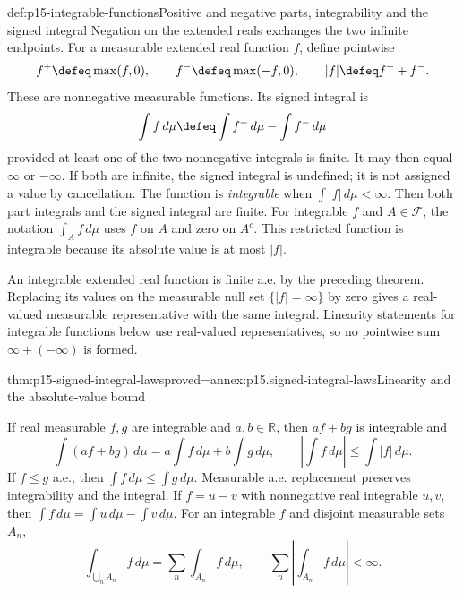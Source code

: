 \begin{hbdefinition}{def:p15-integrable-functions}{Positive and negative parts, integrability and the signed integral}
Negation on the extended reals exchanges the two infinite endpoints.
For a measurable extended real function \(f\), define pointwise
\[
 f^+\defeq\max(f,0),\qquad f^-\defeq\max(-f,0),\qquad
 |f|\defeq f^++f^-.
\]
These are nonnegative measurable functions. Its signed integral is
\[
 \int f\,d\mu\defeq\int f^+\,d\mu-\int f^-\,d\mu
\]
provided at least one of the two nonnegative integrals is finite.
It may then equal \(\infty\) or \(-\infty\). If both are infinite,
the signed integral is undefined; it is not assigned a value by cancellation.
The function is \emph{integrable} when \(\int|f|\,d\mu<\infty\).
Then both part integrals and the signed integral are finite.
For integrable \(f\) and \(A\in\mathcal F\), the notation
\(\int_A f\,d\mu\) uses \(f\) on \(A\) and zero on \(A^c\).
This restricted function is integrable because its absolute value is
at most \(|f|\).

An integrable extended real function is finite a.e. by the preceding
theorem. Replacing its values on the measurable null set
\(\{|f|=\infty\}\) by zero gives a real-valued measurable
representative with the same integral. Linearity statements for integrable
functions below use real-valued representatives, so no pointwise sum
\(\infty+(-\infty)\) is formed.
\end{hbdefinition}

\begin{hbtheorem}{thm:p15-signed-integral-laws}{proved=annex:p15.signed-integral-laws}{Linearity and the absolute-value bound}
\par\nobreak
If real measurable \(f,g\) are integrable and \(a,b\in\mathbb R\),
then \(af+bg\) is integrable and
\[
 \int(af+bg)\,d\mu=a\int f\,d\mu+b\int g\,d\mu,
 \qquad
 \left|\int f\,d\mu\right|\leq\int|f|\,d\mu.
\]
If \(f\leq g\) a.e., then \(\int f\,d\mu\leq\int g\,d\mu\).
Measurable a.e. replacement preserves integrability and the integral.
If \(f=u-v\) with nonnegative real integrable \(u,v\), then
\(\int f\,d\mu=\int u\,d\mu-\int v\,d\mu\).
For an integrable \(f\) and disjoint measurable sets \(A_n\),
\[
 \int_{\bigcup_n A_n}f\,d\mu=\sum_n\int_{A_n}f\,d\mu,
 \qquad
 \sum_n\left|\int_{A_n}f\,d\mu\right|<\infty.
\]
\end{hbtheorem}

